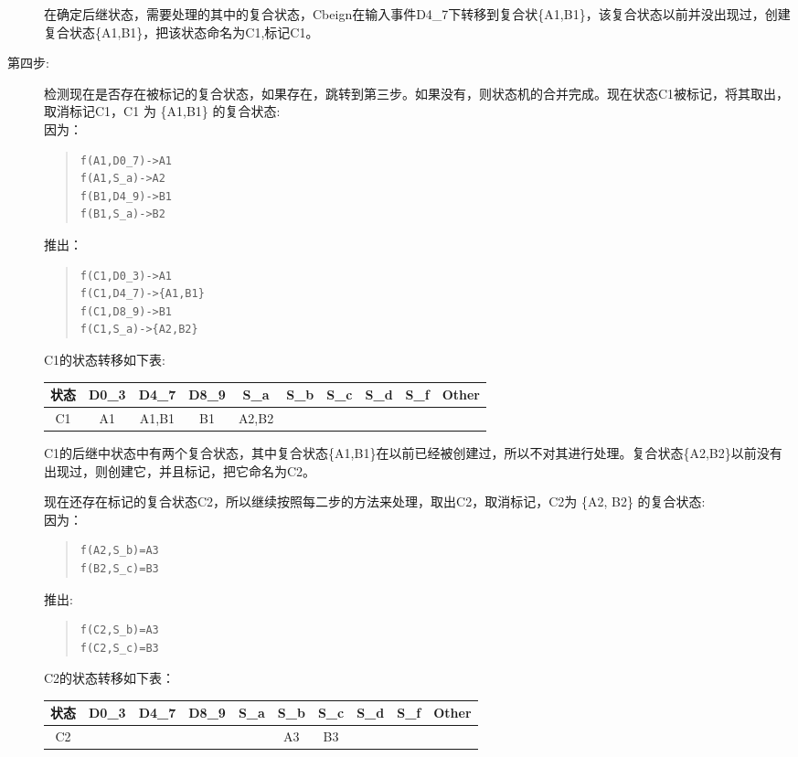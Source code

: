 \begin{description}
在确定后继状态，需要处理的其中的复合状态，Cbeign在输入事件D4\_7下转移到复合状\{A1,B1\}，该复合状态以前并没出现过，创建复合状态\{A1,B1\}，把该状态命名为C1,标记C1。
\item[第四步:] 检测现在是否存在被标记的复合状态，如果存在，跳转到第三步。如果没有，则状态机的合并完成。现在状态C1被标记，将其取出，取消标记C1，C1 为 \{A1,B1\} 的复合状态:\\
因为：
\begin{quote}
\begin{verbatim}
f(A1,D0_7)->A1
f(A1,S_a)->A2
f(B1,D4_9)->B1
f(B1,S_a)->B2
\end{verbatim}
\end{quote}
推出：
\begin{quote}
\begin{verbatim}
f(C1,D0_3)->A1
f(C1,D4_7)->{A1,B1}
f(C1,D8_9)->B1
f(C1,S_a)->{A2,B2}
\end{verbatim}
\end{quote}

C1的状态转移如下表:

\begin{tabular}[c]{c|c|c|c|c|c|c|c|c|c}
状态&	D0\_3&D4\_7&D8\_9&S\_a&S\_b&S\_c&S\_d&S\_f&Other \\
\hline
C1&A1&A1,B1&B1&A2,B2&&&&& \\
\hline
\end{tabular}

C1的后继中状态中有两个复合状态，其中复合状态\{A1,B1\}在以前已经被创建过，所以不对其进行处理。复合状态\{A2,B2\}以前没有出现过，则创建它，并且标记，把它命名为C2。

现在还存在标记的复合状态C2，所以继续按照每二步的方法来处理，取出C2，取消标记，C2为 \{A2, B2\} 的复合状态: \\
因为：
\begin{quote}
\begin{verbatim}
f(A2,S_b)=A3
f(B2,S_c)=B3
\end{verbatim}
\end{quote}
推出:
\begin{quote}
\begin{verbatim}
f(C2,S_b)=A3
f(C2,S_c)=B3
\end{verbatim}
\end{quote}

C2的状态转移如下表：

\begin{tabular}[c]{c|c|c|c|c|c|c|c|c|c}
状态&	D0\_3&D4\_7&D8\_9&S\_a&S\_b&S\_c&S\_d&S\_f&Other \\
\hline
C2&&&&&A3&B3&&& \\
\hline
\end{tabular}
\end{description}

